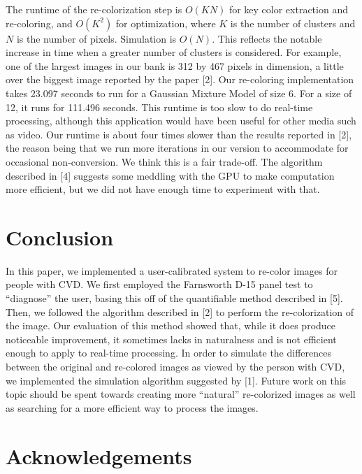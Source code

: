 \documentclass[10pt,twocolumn,letterpaper]{article}
\begin{document}
The runtime of the re-colorization step is $O(KN)$ for key color extraction and re-coloring, and $O(K^{2})$ for optimization, where $K$ is the number of clusters and $N$ is the number of pixels. Simulation is $O(N)$. This reflects the notable increase in time when a greater number of clusters is considered. For example, one of the largest images in our bank is 312 by 467 pixels in dimension, a little over the biggest image reported by the paper [2]. Our re-coloring implementation takes 23.097 seconds to run for a Gaussian Mixture Model of size 6. For a size of 12, it runs for 111.496 seconds. This runtime is too slow to do real-time processing, although this application would have been useful for other media such as video. Our runtime is about four times slower than the results reported in [2], the reason being that we run more iterations in our version to accommodate for occasional non-conversion.  We think this is a fair trade-off.  The algorithm described in [4] suggests some meddling with the GPU to make computation more efficient, but we did not have enough time to experiment with that. 

\section{Conclusion}

In this paper, we implemented a user-calibrated system to re-color images for people with CVD. We first employed the Farnsworth D-15 panel test to “diagnose” the user, basing this off of the quantifiable method described in [5]. Then, we followed the algorithm described in [2] to perform the re-colorization of the image. Our evaluation of this method showed that, while it does produce noticeable improvement, it sometimes lacks in naturalness and is not efficient enough to apply to real-time processing. In order to simulate the differences between the original and re-colored images as viewed by the person with CVD, we implemented the simulation algorithm suggested by [1]. Future work on this topic should be spent towards creating more “natural” re-colorized images as well as searching for a more efficient way to process the images.

\section{Acknowledgements}
\end{document}

